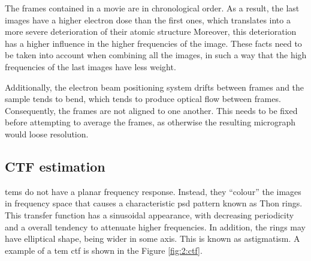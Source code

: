 \documentclass[../main.tex]{subfiles}
\begin{document}
The frames contained in a movie are in chronological order. As a result, the last images have a higher electron dose than the first ones, which translates into a more severe deterioration of their atomic structure  Moreover, this deterioration has a higher influence in the higher frequencies of the image. These facts need to be taken into account when combining all the images, in such a way that the high frequencies of the last images have less weight\cite{cryoem101}. 

Additionally, the electron beam positioning system drifts between frames and the sample tends to bend, which tends to produce optical flow between frames. Consequently, the frames are not aligned to one another. This needs to be fixed before attempting to average the frames, as otherwise the resulting micrograph would loose resolution.

\subsection{CTF estimation}
\Glspl{tem} do not have a planar frequency response. Instead, they ``colour'' the images in frequency space that causes a characteristic \gls{psd} pattern known as Thon rings. This transfer function has a sinusoidal appearance, with decreasing periodicity and a overall tendency to attenuate higher frequencies\cite{cryoem101}.  In addition, the rings may have elliptical shape, being wider in some axis. This is known as astigmatism. A example of a \gls{tem} \gls{ctf} is shown in the Figure \ref{fig:2:ctf}.
\end{document}
